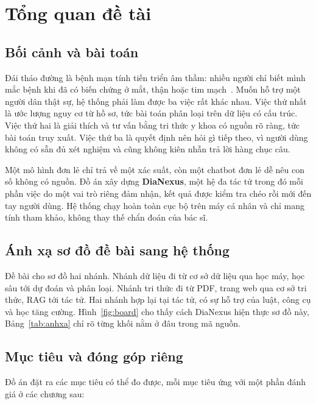 \chapter{Tổng quan đề tài}\label{chap:tongquan}

\section{Bối cảnh và bài toán}

Đái tháo đường là bệnh mạn tính tiến triển âm thầm: nhiều người chỉ biết mình mắc bệnh khi đã có biến chứng ở mắt, thận hoặc tim mạch~\cite{idf}. Muốn hỗ trợ một người dân thật sự, hệ thống phải làm được ba việc rất khác nhau. Việc thứ nhất là ước lượng nguy cơ từ hồ sơ, tức bài toán phân loại trên dữ liệu có cấu trúc. Việc thứ hai là giải thích và tư vấn bằng tri thức y khoa có nguồn rõ ràng, tức bài toán truy xuất. Việc thứ ba là quyết định nên hỏi gì tiếp theo, vì người dùng không có sẵn đủ xét nghiệm và cũng không kiên nhẫn trả lời hàng chục câu.

Một mô hình đơn lẻ chỉ trả về một xác suất, còn một chatbot đơn lẻ dễ nêu con số không có nguồn. Đồ án xây dựng \textbf{DiaNexus}, một hệ đa tác tử trong đó mỗi phần việc do một vai trò riêng đảm nhận, kết quả được kiểm tra chéo rồi mới đến tay người dùng. Hệ thống chạy hoàn toàn cục bộ trên máy cá nhân và chỉ mang tính tham khảo, không thay thế chẩn đoán của bác sĩ.

\section{Ánh xạ sơ đồ đề bài sang hệ thống}

Đề bài cho sơ đồ hai nhánh. Nhánh dữ liệu đi từ cơ sở dữ liệu qua học máy, học sâu tới dự đoán và phân loại. Nhánh tri thức đi từ PDF, trang web qua cơ sở tri thức, RAG tới tác tử. Hai nhánh hợp lại tại tác tử, có sự hỗ trợ của luật, công cụ và học tăng cường. Hình~\ref{fig:board} cho thấy cách DiaNexus hiện thực sơ đồ này, Bảng~\ref{tab:anhxa} chỉ rõ từng khối nằm ở đâu trong mã nguồn.




\section{Mục tiêu và đóng góp riêng}

Đồ án đặt ra các mục tiêu có thể đo được, mỗi mục tiêu ứng với một phần đánh giá ở các chương sau:

